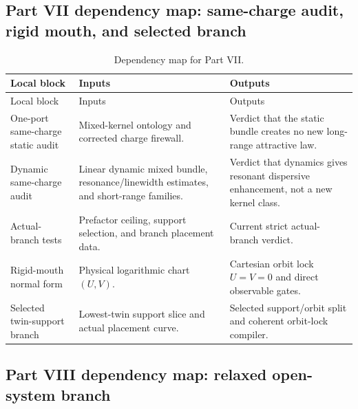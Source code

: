 \subsection{Part VII dependency map: same-charge audit, rigid mouth, and selected branch}
\label{subsec:dep-part-vii}

\begin{longtable}{L{0.18\textwidth}L{0.29\textwidth}L{0.35\textwidth}}
\caption{Dependency map for Part VII.}\label{tab:dep-part-vii}\\
\toprule
Local block & Inputs & Outputs \\
\midrule
\endfirsthead
\toprule
Local block & Inputs & Outputs \\
\midrule
\endhead
One-port same-charge static audit & Mixed-kernel ontology and corrected charge firewall. & Verdict that the static bundle creates no new long-range attractive law. \\
\addlinespace
Dynamic same-charge audit & Linear dynamic mixed bundle, resonance/linewidth estimates, and short-range families. & Verdict that dynamics gives resonant dispersive enhancement, not a new kernel class. \\
\addlinespace
Actual-branch tests & Prefactor ceiling, support selection, and branch placement data. & Current strict actual-branch verdict. \\
\addlinespace
Rigid-mouth normal form & Physical logarithmic chart \((U,V)\). & Cartesian orbit lock \(U=V=0\) and direct observable gates. \\
\addlinespace
Selected twin-support branch & Lowest-twin support slice and actual placement curve. & Selected support/orbit split and coherent orbit-lock compiler. \\
\bottomrule
\end{longtable}

\subsection{Part VIII dependency map: relaxed open-system branch}
\label{subsec:dep-part-viii}

